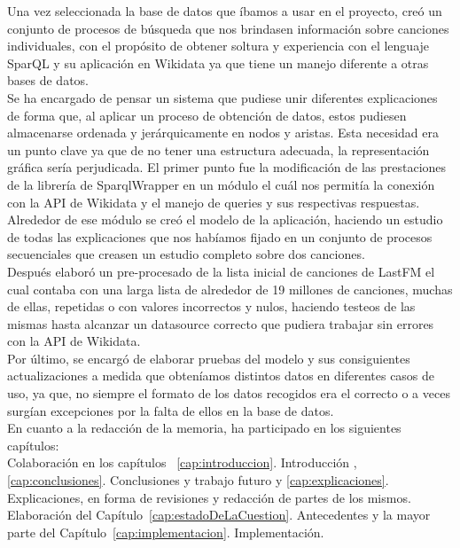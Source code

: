 Una vez seleccionada la base de datos que íbamos a usar en el proyecto, creó un conjunto de procesos de búsqueda que nos brindasen información sobre canciones individuales, con el propósito de obtener soltura y experiencia con el lenguaje SparQL y su aplicación en Wikidata ya que tiene un manejo diferente a otras bases de datos.\\

Se ha encargado de pensar un sistema que pudiese unir diferentes explicaciones de forma que, al aplicar un proceso de obtención de datos, estos pudiesen almacenarse ordenada y jerárquicamente en nodos y aristas. Esta necesidad era un punto clave ya que de no tener una estructura adecuada, la representación gráfica sería perjudicada. El primer punto fue la modificación de las prestaciones de la librería de SparqlWrapper en un módulo el cuál nos permitía la conexión con la API de Wikidata y el manejo de queries y sus respectivas respuestas. Alrededor de ese módulo se creó el modelo de la aplicación, haciendo un estudio de todas las explicaciones que nos habíamos fijado en un conjunto de procesos secuenciales que creasen un estudio completo sobre dos canciones.\\

Después elaboró un pre-procesado de la lista inicial de canciones de LastFM el cual contaba con una larga lista de alrededor de 19 millones de canciones, muchas de ellas, repetidas o con valores incorrectos y nulos, haciendo testeos de las mismas hasta alcanzar un datasource correcto que pudiera trabajar sin errores con la API de Wikidata.\\

Por último, se encargó de elaborar pruebas del modelo y sus consiguientes actualizaciones a medida que obteníamos distintos datos en diferentes casos de uso, ya que, no siempre el formato de los datos recogidos era el correcto o a veces surgían excepciones por la falta de ellos en la base de datos.\\

En cuanto a la redacción de la memoria, ha participado en los siguientes capítulos:\\

Colaboración en los capítulos ~\ref{cap:introduccion}. Introducción , \ref{cap:conclusiones}. Conclusiones y trabajo futuro y \ref{cap:explicaciones}. Explicaciones, en forma de revisiones y redacción de partes de los mismos.\\

Elaboración del Capítulo~\ref{cap:estadoDeLaCuestion}. Antecedentes y la mayor parte del Capítulo~\ref{cap:implementacion}. Implementación.


